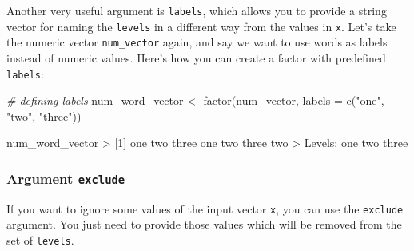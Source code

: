 \documentclass[
]{book}
\newenvironment{Shaded}{\begin{snugshade}}{\end{snugshade}}
\newcommand{\AttributeTok}[1]{\textcolor[rgb]{0.77,0.63,0.00}{#1}}
\newcommand{\CommentTok}[1]{\textcolor[rgb]{0.56,0.35,0.01}{\textit{#1}}}
\newcommand{\DecValTok}[1]{\textcolor[rgb]{0.00,0.00,0.81}{#1}}
\newcommand{\FunctionTok}[1]{\textcolor[rgb]{0.00,0.00,0.00}{#1}}
\newcommand{\NormalTok}[1]{#1}
\newcommand{\OtherTok}[1]{\textcolor[rgb]{0.56,0.35,0.01}{#1}}
\newcommand{\SpecialCharTok}[1]{\textcolor[rgb]{0.00,0.00,0.00}{#1}}
\newcommand{\StringTok}[1]{\textcolor[rgb]{0.31,0.60,0.02}{#1}}
\begin{document}
Another very useful argument is \texttt{labels}, which allows you to provide a string
vector for naming the \texttt{levels} in a different way from the values in \texttt{x}. Let's
take the numeric vector \texttt{num\_vector} again, and say we want to use words as
labels instead of numeric values. Here's how you can create a factor with
predefined \texttt{labels}:

\begin{Shaded}
\begin{Highlighting}[]
\CommentTok{\# defining labels}
\NormalTok{num\_word\_vector }\OtherTok{\textless{}{-}} \FunctionTok{factor}\NormalTok{(num\_vector, }\AttributeTok{labels =} \FunctionTok{c}\NormalTok{(}\StringTok{"one"}\NormalTok{, }\StringTok{"two"}\NormalTok{, }\StringTok{"three"}\NormalTok{))}

\NormalTok{num\_word\_vector}
\SpecialCharTok{\textgreater{}}\NormalTok{ [}\DecValTok{1}\NormalTok{] one   two   three one   two   three two  }
\SpecialCharTok{\textgreater{}}\NormalTok{ Levels}\SpecialCharTok{:}\NormalTok{ one two three}
\end{Highlighting}
\end{Shaded}

\hypertarget{argument-exclude}{%
\subsubsection*{\texorpdfstring{Argument \texttt{exclude}}{Argument exclude}}\label{argument-exclude}}

If you want to ignore some values of the input vector \texttt{x}, you can use the
\texttt{exclude} argument. You just need to provide those values which will be removed
from the set of \texttt{levels}.
\end{document}
